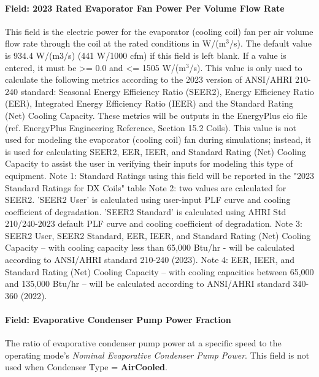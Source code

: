 \paragraph{Field: 2023 Rated Evaporator Fan Power Per Volume Flow Rate}

This field is the electric power for the evaporator (cooling coil) fan per air volume flow rate through the coil at the rated conditions in W/(m\(^{3}\)/s). The default value is 934.4 W/(m3/s) (441 W/1000 cfm) if this field is left blank. If a value is entered, it must be \textgreater{}= 0.0 and \textless{}= 1505 W/(m\(^{3}\)/s). This value is only used to calculate the following metrics according to the 2023 version of ANSI/AHRI 210-240 standard: Seasonal Energy Efficiency Ratio (SEER2), Energy Efficiency Ratio (EER), Integrated Energy Efficiency Ratio (IEER) and the Standard Rating (Net) Cooling Capacity.  These metrics will be outputs in the EnergyPlus eio file (ref. EnergyPlus Engineering Reference, Section 15.2 Coils). This value is not used for modeling the evaporator (cooling coil) fan during simulations; instead, it is used for calculating SEER2, EER, IEER, and Standard Rating (Net) Cooling Capacity to assist the user in verifying their inputs for modeling this type of equipment. 
Note 1: Standard Ratings using this field will be reported in the "2023 Standard Ratings for DX Coils" table
Note 2: two values are calculated for SEER2. 'SEER2 User' is calculated using user-input PLF curve and cooling coefficient of degradation. 'SEER2 Standard' is calculated using AHRI Std 210/240-2023 default PLF curve and cooling coefficient of degradation.
Note 3: SEER2 User, SEER2 Standard, EER, IEER, and Standard Rating (Net) Cooling Capacity -- with cooling capacity less than 65,000 Btu/hr - will be calculated according to ANSI/AHRI standard 210-240 (2023).
Note 4: EER, IEER, and Standard Rating (Net) Cooling Capacity -- with cooling capacities between 65,000 and 135,000 Btu/hr -- will be calculated according to ANSI/AHRI standard 340-360 (2022).

\paragraph{Field: Evaporative Condenser Pump Power Fraction}\label{field-evaporative-condenser-pump-power-fraction}

The ratio of evaporative condenser pump power at a specific speed to the operating mode's \textit{Nominal Evaporative Condenser Pump Power}. This field is not used when Condenser Type = \textbf{AirCooled}.

